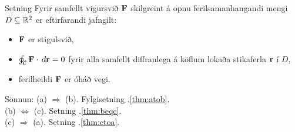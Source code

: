 \begin{frame}{} 

\begin {block}{Setning \rtask{}}
 Fyrir samfellt vigursvið $\mbox{${\bf F}$}$ skilgreint á opnu 
ferilsamanhangandi mengi $D\subseteq {\mathbb R}^2$ er eftirfarandi jafngilt:
\begin{itemize}
 \item [(a)] $\mbox{${\bf F}$}$ er stigulsvið,
 \item [(b)]  $\oint_{\cal C} \mbox{${\bf F}$}\cdot\,d\mbox{${\bf r}$}=0$ fyrir alla samfellt diffranlega
á köflum lokaða stikaferla $\mbox{${\bf r}$}$ í $D$, 
\item [(c)] ferilheildi $\mbox{${\bf F}$}$ er óháð vegi.
\end{itemize}
\end{block}
\pause
\begin {block}{Sönnun: } 
(a) $\Rightarrow$ (b). Fylgisetning \kaflanr.\ref{thm:atob}. \\
(b) $\Leftrightarrow$ (c). Setning \kaflanr.\ref{thm:beqc}. \\
(c) $\Rightarrow$ (a). Setning \kaflanr.\ref{thm:ctoa}.
 
\end {block}

\end{frame}

